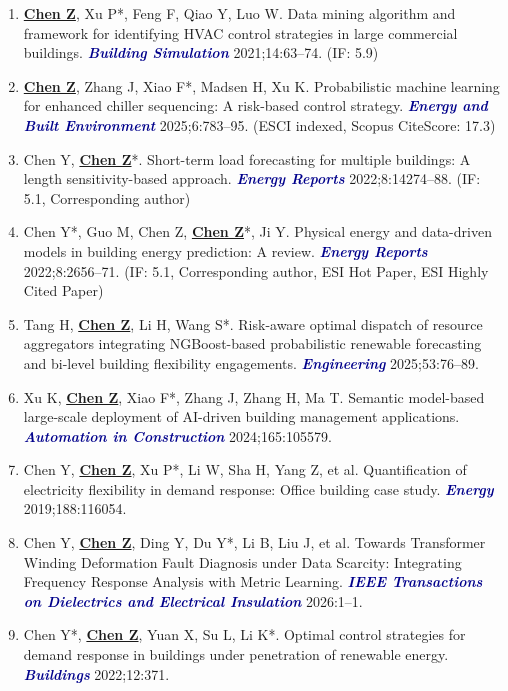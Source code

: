 \documentclass[11pt,a4paper]{article}
\newcommand{\me}[1]{\underline{\textbf{#1}}}
\newcommand{\journal}[1]{\textcolor{darkblue}{\textbf{\textit{#1}}}}
\begin{document}
\begin{enumerate}
\item \me{Chen Z}, Xu P*, Feng F, Qiao Y, Luo W. Data mining algorithm and framework for identifying HVAC control strategies in large commercial buildings. \journal{Building Simulation} 2021;14:63--74. (IF: 5.9)

\item \me{Chen Z}, Zhang J, Xiao F*, Madsen H, Xu K. Probabilistic machine learning for enhanced chiller sequencing: A risk-based control strategy. \journal{Energy and Built Environment} 2025;6:783--95. (ESCI indexed, Scopus CiteScore: 17.3)

\item Chen Y, \me{Chen Z}*. Short-term load forecasting for multiple buildings: A length sensitivity-based approach. \journal{Energy Reports} 2022;8:14274--88. (IF: 5.1, Corresponding author)

\item Chen Y*, Guo M, Chen Z, \me{Chen Z}*, Ji Y. Physical energy and data-driven models in building energy prediction: A review. \journal{Energy Reports} 2022;8:2656--71. (IF: 5.1, Corresponding author, ESI Hot Paper, ESI Highly Cited Paper)

\item Tang H, \me{Chen Z}, Li H, Wang S*. Risk-aware optimal dispatch of resource aggregators integrating NGBoost-based probabilistic renewable forecasting and bi-level building flexibility engagements. \journal{Engineering} 2025;53:76--89.

\item Xu K, \me{Chen Z}, Xiao F*, Zhang J, Zhang H, Ma T. Semantic model-based large-scale deployment of AI-driven building management applications. \journal{Automation in Construction} 2024;165:105579.

\item Chen Y, \me{Chen Z}, Xu P*, Li W, Sha H, Yang Z, et al. Quantification of electricity flexibility in demand response: Office building case study. \journal{Energy} 2019;188:116054.

\item Chen Y, \me{Chen Z}, Ding Y, Du Y*, Li B, Liu J, et al. Towards Transformer Winding Deformation Fault Diagnosis under Data Scarcity: Integrating Frequency Response Analysis with Metric Learning. \journal{IEEE Transactions on Dielectrics and Electrical Insulation} 2026:1--1.

\item Chen Y*, \me{Chen Z}, Yuan X, Su L, Li K*. Optimal control strategies for demand response in buildings under penetration of renewable energy. \journal{Buildings} 2022;12:371.


\end{enumerate}
\end{document}
